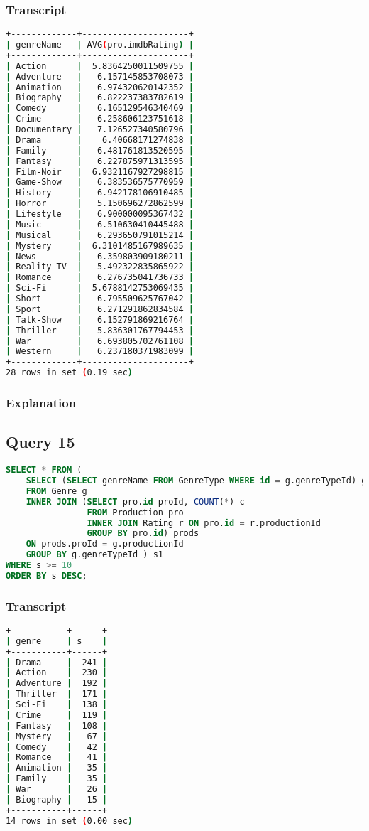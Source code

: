 \subsubsection{Transcript}
\begin{lstlisting}[language=bash]
+-------------+---------------------+
| genreName   | AVG(pro.imdbRating) |
+-------------+---------------------+
| Action      |  5.8364250011509755 |
| Adventure   |   6.157145853708073 |
| Animation   |   6.974320620142352 |
| Biography   |   6.822237383782619 |
| Comedy      |   6.165129546340469 |
| Crime       |   6.258606123751618 |
| Documentary |   7.126527340580796 |
| Drama       |    6.40668171274838 |
| Family      |   6.481761813520595 |
| Fantasy     |   6.227875971313595 |
| Film-Noir   |  6.9321167927298815 |
| Game-Show   |   6.383536575770959 |
| History     |   6.942178106910485 |
| Horror      |   5.150696272862599 |
| Lifestyle   |   6.900000095367432 |
| Music       |   6.510630410445488 |
| Musical     |   6.293650791015214 |
| Mystery     |  6.3101485167989635 |
| News        |   6.359803909180211 |
| Reality-TV  |   5.492322835865922 |
| Romance     |   6.276735041736733 |
| Sci-Fi      |  5.6788142753069435 |
| Short       |   6.795509625767042 |
| Sport       |   6.271291862834584 |
| Talk-Show   |   6.152791869216764 |
| Thriller    |   5.836301767794453 |
| War         |   6.693805702761108 |
| Western     |   6.237180371983099 |
+-------------+---------------------+
28 rows in set (0.19 sec)
\end{lstlisting}

\subsubsection{Explanation}


\subsection{Query 15}
\begin{lstlisting}[language=sql]
SELECT * FROM (
	SELECT (SELECT genreName FROM GenreType WHERE id = g.genreTypeId) genre, SUM(prods.c) s
	FROM Genre g
	INNER JOIN (SELECT pro.id proId, COUNT(*) c
				FROM Production pro
				INNER JOIN Rating r ON pro.id = r.productionId
				GROUP BY pro.id) prods
	ON prods.proId = g.productionId
	GROUP BY g.genreTypeId ) s1
WHERE s >= 10
ORDER BY s DESC;
\end{lstlisting}

\subsubsection{Transcript}
\begin{lstlisting}[language=bash]
+-----------+------+
| genre     | s    |
+-----------+------+
| Drama     |  241 |
| Action    |  230 |
| Adventure |  192 |
| Thriller  |  171 |
| Sci-Fi    |  138 |
| Crime     |  119 |
| Fantasy   |  108 |
| Mystery   |   67 |
| Comedy    |   42 |
| Romance   |   41 |
| Animation |   35 |
| Family    |   35 |
| War       |   26 |
| Biography |   15 |
+-----------+------+
14 rows in set (0.00 sec)
\end{lstlisting}

